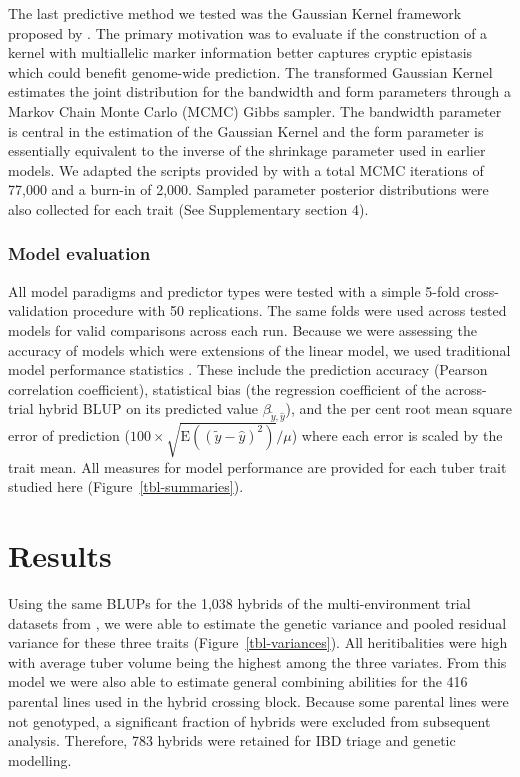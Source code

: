 \begin{refsection}
The last predictive method we tested was the Gaussian Kernel framework
proposed by \parencite{Perez-Elizalde2015}. The primary motivation was to
evaluate if the construction of a kernel with multiallelic marker
information better captures cryptic epistasis which could benefit
genome-wide prediction. The transformed Gaussian Kernel estimates the
joint distribution for the bandwidth and form parameters through a
Markov Chain Monte Carlo (MCMC) Gibbs sampler. The bandwidth parameter
is central in the estimation of the Gaussian Kernel and the form
parameter is essentially equivalent to the inverse of the shrinkage
parameter used in earlier models. We adapted the scripts provided by
\parencite{Perez-Elizalde2015} with a total MCMC iterations of 77,000 and
a burn-in of 2,000. Sampled parameter posterior distributions were also collected for each trait (See Supplementary section 4).

\subsubsection{Model evaluation}\label{model-evaluation}

All model paradigms and predictor types were tested with a simple 5-fold
cross-validation procedure with 50 replications. The same folds were
used across tested models for valid comparisons across each run. Because
we were assessing the accuracy of models which were extensions of the linear model, we used traditional model
performance statistics \parencite{Hsu2017}. These include the prediction
accuracy (Pearson correlation coefficient), statistical bias (the
regression coefficient of the across-trial hybrid BLUP on its predicted value
\(\beta_{\tilde{y}, \hat{y}}\)), and the per cent root mean square error
of prediction
(\(100 \times \sqrt{\mathrm{E}\left ((\tilde{y} - \hat{y}) ^ 2 \right )} / \mu\))
where each error is scaled by the trait mean. All measures for model
performance are provided for each tuber trait studied here
(Figure~\ref{tbl-summaries}).

\section{Results}\label{results}

Using the same BLUPs for the 1,038 hybrids of the multi-environment
trial datasets from \parencite{Adams2023}, we were able to estimate the
genetic variance and pooled residual variance for these three traits
(Figure~\ref{tbl-variances}). All heritibalities were high with average
tuber volume being the highest among the three variates. From this model
we were also able to estimate general combining abilities for the 416
parental lines used in the hybrid crossing block. Because some parental
lines were not genotyped, a significant fraction of hybrids were
excluded from subsequent analysis. Therefore, 783 hybrids were retained
for IBD triage and genetic modelling.


\end{refsection}

